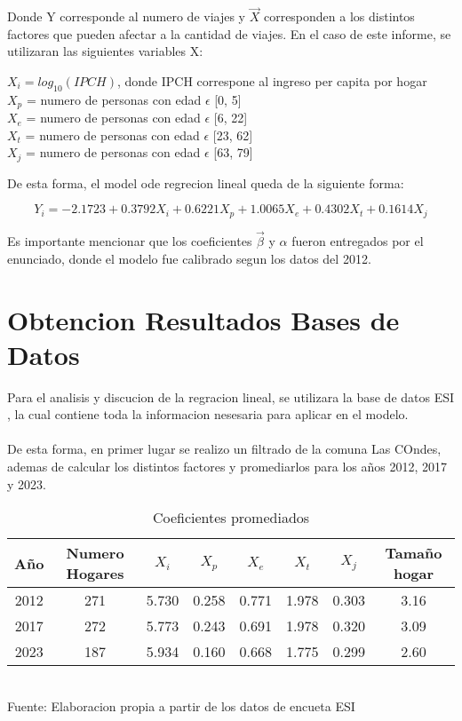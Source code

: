 \documentclass[12pt]{article} %
\begin{document}
Donde Y corresponde al numero de viajes y $\vec{X}$ corresponden a los distintos factores que pueden afectar a la cantidad de viajes. En el caso de este informe, se utilizaran las siguientes variables X:

\begin{center}
    $X_i = log_{10}(IPCH)$, donde IPCH correspone al ingreso per capita por hogar\\
    $X_p$ = numero de personas con edad $\epsilon$ [0, 5]\\
    $X_e$ = numero de personas con edad $\epsilon$ [6, 22]\\
    $X_t$ = numero de personas con edad $\epsilon$ [23, 62]\\
    $X_j$ = numero de personas con edad $\epsilon$ [63, 79]\\
\end{center}

De esta forma, el model ode regrecion lineal queda de la siguiente forma:

\begin{equation}
    Y_i = -2.1723 + 0.3792X_i + 0.6221X_p + 1.0065X_e + 0.4302X_t + 0.1614X_j
    \label{eq:regrecion}
\end{equation}

Es importante mencionar que los coeficientes $\vec{\beta}$ y $\alpha$ fueron entregados por el enunciado, donde el modelo fue calibrado segun los datos del 2012.

\section{Obtencion Resultados Bases de Datos}

Para el analisis y  discucion de la regracion lineal, se utilizara la base de datos ESI \textbf{\cite{esi}}, la cual contiene toda la informacion nesesaria para aplicar en el modelo.
\\ \\
De esta forma, en primer lugar se realizo un filtrado de la comuna Las COndes, ademas de calcular los distintos factores y promediarlos para los años 2012, 2017 y 2023.

\begin{table}[H]
    \centering
    \caption{Coeficientes promediados}
    \vspace{0.2cm}
    \begin{tabular}{|c|c|c|c|c|c|c|c|}
        \hline
        Año & Numero Hogares & $X_i$ & $X_p$ & $X_e$ & $X_t$ & $X_j$ & Tamaño hogar \\
        \hline
        2012 & 271 &5.730 & 0.258 & 0.771 & 1.978 & 0.303 & 3.16\\
        2017 & 272 &5.773 & 0.243 & 0.691 & 1.978 & 0.320 & 3.09\\
        2023 & 187 &5.934 & 0.160 & 0.668 & 1.775 & 0.299 & 2.60\\
        \hline
    \end{tabular}
    \vspace{0.2cm}
    \\Fuente: Elaboracion propia a partir de los datos de encueta ESI \textbf{\cite{esi}}
\end{table}
\end{document}
